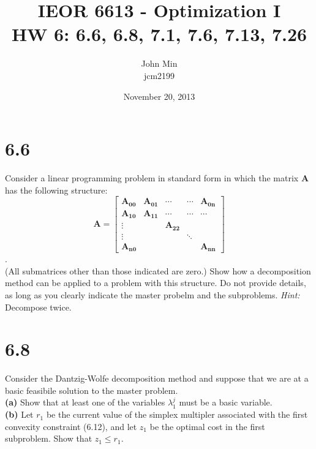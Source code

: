 \documentclass{article}
\begin{document}
\title{IEOR 6613 - Optimization I\\ HW 6:  6.6, 6.8, 7.1, 7.6, 7.13, 7.26}

\author{John Min\\ jcm2199}
\date{November 20, 2013}
\maketitle

\section*{6.6}
Consider a linear programming problem in standard form in which the matrix $\mathbf{A}$ has the following structure: \\
$$ \mathbf{A = } 
\begin{bmatrix} \mathbf{A_{00}} & \mathbf{A_{01}} & \cdots & \cdots & \mathbf{A_{0n}} \\
				\mathbf{A_{10}} & \mathbf{A_{11}} & \cdots & \cdots & \cdots	\\
				\vdots & & \mathbf{A_{22}} \\
				\vdots & & & \ddots \\
				\mathbf{A_{n0}} & & & & \mathbf{A_{nn}}
\end{bmatrix} $$. \\
(All submatrices other than those indicated are zero.)  Show how a decomposition method can be applied to a problem with this structure.  Do not provide details, as long as you clearly indicate the master probelm and the subproblems.  \emph{Hint:} Decompose twice. \\

\noindent


\section*{6.8}  
Consider the Dantzig-Wolfe decomposition method and suppose that we are at a basic feasibile solution to the master problem. \\

\noindent
\textbf{(a)} Show that at least one of the variables $\lambda_1^j$ must be a basic variable. \\

\noindent
\textbf{(b)}  Let $r_1$ be the current value of the simplex multipler associated with the first convexity constraint (6.12), and let $z_1$ be the optimal cost in the first subproblem.  Show that $z_1 \leq r_1$.  
\end{document}
